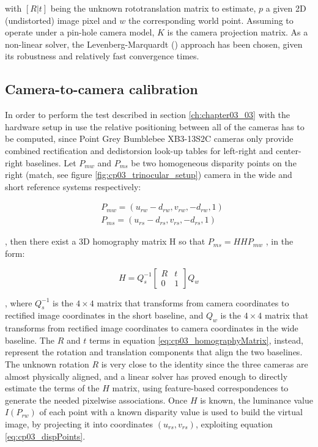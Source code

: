 with $[R|t]$ being the unknown rototranslation matrix to estimate, $p$ a given 2D (undistorted) image pixel and $w$ the corresponding world point. Assuming to operate under a pin-hole camera model, $K$ is the camera projection matrix. As a non-linear solver, the Levenberg-Marquardt (\cite{Levenberg1944}) approach has been chosen, given its robustness and relatively fast convergence times.

\subsection{Camera-to-camera calibration}\label{ch:chapter03_02_02}

In order to perform the test described in section \ref{ch:chapter03_03} with the hardware setup in use the relative positioning between all of the cameras has to be computed, since Point Grey Bumblebee\textregistered{} XB3-13S2C cameras only provide combined rectification and dedistorsion look-up tables for left-right and center-right baselines.
Let $P_{mw}$ and $P_{ms}$ be two homogeneous disparity points on the right (match, see figure \ref{fig:cp03_trinocular_setup}) camera in the wide and short reference systems respectively:

\begin{align}\label{eq:cp03_dispPoints}
& P_{mw} = (u_{rw} - d_{rw}, v_{rw}, -d_{rw}, 1) \nonumber \\
& P_{ms} = (u_{rs} - d_{rs}, v_{rs}, -d_{rs}, 1)
\end{align}

, then there exist a 3D homography matrix H so that $P_{ms} = HHP_{mw}$ , in the form:

\begin{equation}\label{eq:cp03_homographyMatrix}
H = Q_s^{-1} \left[ \begin{array}{cc}
R & t \\
0 & 1 \end{array} \right] Q_w
\end{equation}

, where $Q_s^{-1}$ is the $4 \times 4$ matrix that transforms from camera coordinates to rectified image coordinates in the short baseline, and $Q_w$ is the $4 \times 4$ matrix that transforms from rectified image coordinates to camera coordinates in the wide baseline. The $R$ and $t$ terms in equation \ref{eq:cp03_homographyMatrix}, instead, represent the rotation and translation components that align the two baselines. The unknown rotation $R$ is very close to the identity since the three cameras are almost physically aligned, and a linear solver has proved enough to directly estimate the terms of the $H$ matrix, using feature-based correspondences to generate the needed pixelwise associations. Once $H$ is known, the luminance value $I(P_{rw})$ of each point with a known disparity value is used to build the virtual image, by projecting it into coordinates $(u_{rs} , v_{rs})$, exploiting equation \ref{eq:cp03_dispPoints}.

